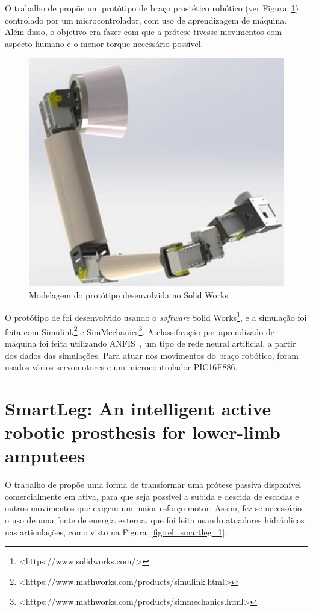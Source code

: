 
O trabalho de  propõe um protótipo de braço prostético robótico (ver Figura~\ref{fig:rel_kumar_1}) controlado por um microcontrolador, com uso de aprendizagem de máquina. Além disso, o objetivo era fazer com que a prótese tivesse movimentos com aspecto humano e o menor torque necessário possível.

\begin{figure}[!htp]
	\caption{\label{fig:rel_kumar_1}Modelagem do protótipo desenvolvida no Solid Works}
	\begin{center}
	    \includegraphics[width=.3\textwidth]{resources/rel_kumar_1}
	\end{center}
\end{figure}

O protótipo de  foi desenvolvido usando o \textit{software} Solid Works\footnote{<https://www.solidworks.com/>}, e a simulação foi feita com Simulink\footnote{<https://www.mathworks.com/products/simulink.html>} e SimMechanics\footnote{<https://www.mathworks.com/products/simmechanics.html>}. A classificação por aprendizado de máquina foi feita utilizando ANFIS~\cite{jang:1993anfis}, um tipo de rede neural artificial, a partir dos dados das simulações. Para atuar nos movimentos do braço robótico, foram usados vários servomotores e um microcontrolador PIC16F886.


\section{SmartLeg: An intelligent active robotic prosthesis for lower-limb amputees}\label{sec:rel_smartleg}

O trabalho de  propõe uma forma de transformar uma prótese passiva disponível comercialmente em ativa, para que seja possível a subida e descida de escadas e outros movimentos que exigem um maior esforço motor. Assim, fez-se necessário o uso de uma fonte de energia externa, que foi feita usando atuadores hidráulicos nas articulações, como visto na Figura~\ref{fig:rel_smartleg_1}.

